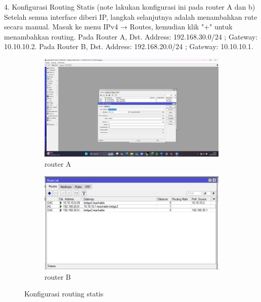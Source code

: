 4. Konfigurasi Routing Statis (note lakukan konfigurasi ini pada router A dan b) Setelah semua interface diberi IP, langkah selanjutnya adalah menambahkan rute secara manual. Masuk ke menu IPv4 → Routes, kemudian klik "+" untuk menambahkan routing. Pada Router A, Dst. Address: 192.168.30.0/24 ; Gateway: 10.10.10.2. Pada Router B, Dst. Address: 192.168.20.0/24 ; Gateway: 10.10.10.1.
\begin{figure}[H]
    \centering
    \begin{subfigure}[b]{0.3\linewidth}
      \centering
      \includegraphics[width=\linewidth]{image/bridge6.jpg}
      \caption{router A}
    \end{subfigure}
    \hspace{1cm}
    \begin{subfigure}[b]{0.3\linewidth}
      \centering
      \includegraphics[width=\linewidth]{image/bridge3.png}
      \caption{router B}
    \end{subfigure}
    \caption{Konfigurasi routing statis}
\end{figure}

